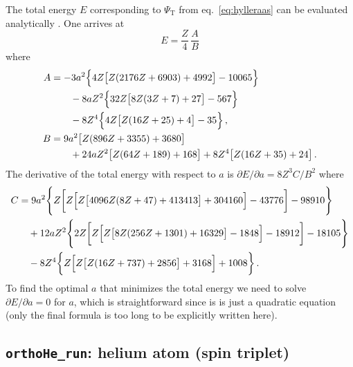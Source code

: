 \documentclass[12pt,a4paper]{article}
\def\code#1{{\lstinline$#1$}}
\begin{document}
The total energy $E$ corresponding to $\Psi_\text{T}$ from
eq.~\eqref{eq:hylleraas} can be evaluated analytically
\cite{hylleraas1929,schwartz2006}. One arrives at
\begin{equation}
E=\frac{Z}{4}\,\frac{A}{B}
\end{equation}
where
\begin{align}
A&=
  -3 a^2 \Bigl\{4 Z \bigl[Z (2176 Z+6903)+4992\bigr]-10065\Bigr\}\nonumber\\
 &\qquad -8 a Z^2 \Bigl\{32 Z \bigl[8 Z (3 Z+7)+27\bigr]-567\Bigr\}\nonumber\\
 &\qquad -8 Z^4\Bigl\{4 Z \bigl[Z (16 Z+25)+4\bigr]-35\Bigr\}\,,\\
B&= 9 a^2 \bigl[Z (896 Z+3355)+3680\bigr]\nonumber\\
 &\qquad +24 a Z^2\bigl[Z (64 Z+189)+168\bigr]
  +8Z^4 \bigl[Z (16 Z+35)+24\bigr]\,.
\end{align}
The derivative of the total energy with respect to $a$ is $\partial
E/\partial a=8 Z^3 C/B^2$ where
\begin{align}
C&=9 a^2 \Biggl\{Z \biggl[Z \Bigl[Z \bigl[4096 Z (8 Z+47)+413413\bigr]+304160\Bigr]-43776\biggr]-98910\Biggr\}\nonumber\\
&\quad +12 a Z^2 \Biggl\{2 Z \biggl[Z \Bigl[Z \bigl[8 Z (256 Z+1301)+16329\bigr]-1848\Bigr]-18912\biggr]-18105\Biggr\}\nonumber\\
&\quad -8 Z^4 \biggl\{Z \Bigl[Z \bigl[Z (16 Z+737)+2856\bigr]+3168\Bigr]+1008\biggr\}\,.
\end{align}
To find the optimal $a$ that minimizes the total energy we need to
solve $\partial E/\partial a=0$ for $a$, which is straightforward
since is is just a quadratic equation (only the final formula is too
long to be explicitly written here).



\subsection{\code{orthoHe_run}: helium atom (spin triplet)}
\end{document}
